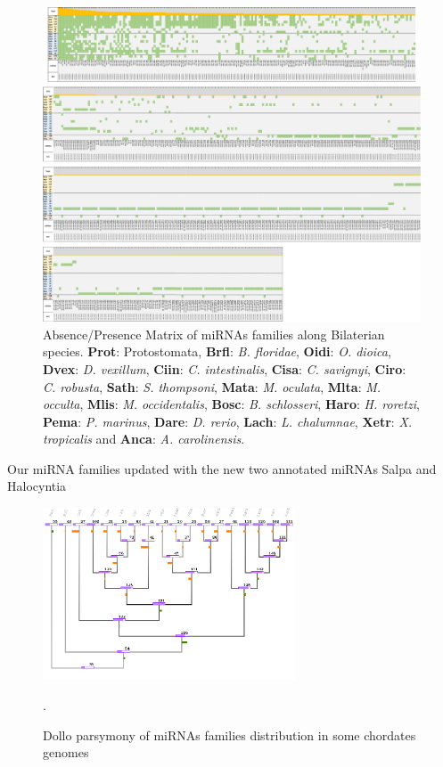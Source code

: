\documentclass[graybox]{svmult}
\begin{document}
\begin{figure}[ht!]
\centering 
\includegraphics[width=\textwidth, angle=90]{./Images/miRNA_matrix}
\caption{Absence/Presence Matrix of miRNAs families along Bilaterian species. 
\textbf{Prot}: Protostomata, \textbf{Brfl}: \textit{B. floridae}, 
\textbf{Oidi}: \textit{O. dioica}, \textbf{Dvex}: \textit{D. vexillum}, 
\textbf{Ciin}: \textit{C. intestinalis}, \textbf{Cisa}: \textit{C. savignyi}, 
\textbf{Ciro}: \textit{C. robusta}, \textbf{Sath}: \textit{S. thompsoni}, 
\textbf{Mata}: \textit{M. oculata}, \textbf{Mlta}: \textit{M. occulta}, 
\textbf{Mlis}: \textit{M. occidentalis}, \textbf{Bosc}: \textit{B. schlosseri}, 
\textbf{Haro}: \textit{H. roretzi}, \textbf{Pema}: \textit{P. marinus}, 
\textbf{Dare}: \textit{D. rerio}, \textbf{Lach}: \textit{L. chalumnae}, 
\textbf{Xetr}: \textit{X. tropicalis} and \textbf{Anca}: \textit{A. 
carolinensis}. }
\label{fig:matrimirnas}
\end{figure}

Our miRNA families updated with the new two annotated miRNAs Salpa and 
Halocyntia

\begin{figure}[t]
\sidecaption[t]
\includegraphics[width=7.5cm]{./Images/last_tree.png}
\caption{Dollo parsymony of miRNAs families distribution in some 
chordates genomes}.
\label{fig:dollotree}
\end{figure}
\end{document}
